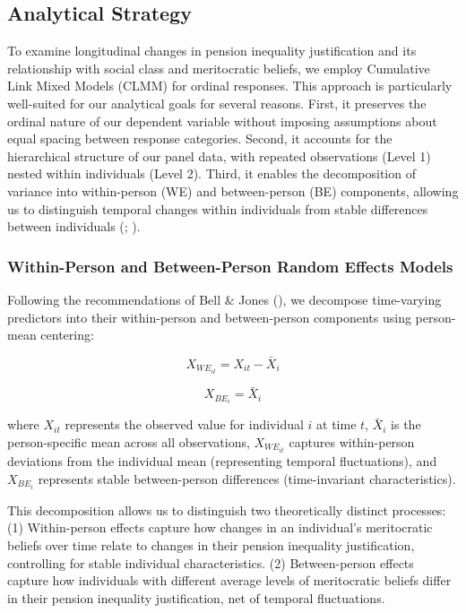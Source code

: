 \documentclass[
  12pt,
]{article}
\begin{document}
\subsection{Analytical Strategy}\label{analytical-strategy}

To examine longitudinal changes in pension inequality justification and
its relationship with social class and meritocratic beliefs, we employ
Cumulative Link Mixed Models (CLMM) for ordinal responses. This approach
is particularly well-suited for our analytical goals for several
reasons. First, it preserves the ordinal nature of our dependent
variable without imposing assumptions about equal spacing between
response categories. Second, it accounts for the hierarchical structure
of our panel data, with repeated observations (Level 1) nested within
individuals (Level 2). Third, it enables the decomposition of variance
into within-person (WE) and between-person (BE) components, allowing us
to distinguish temporal changes within individuals from stable
differences between individuals (; ).

\subsubsection{Within-Person and Between-Person Random Effects
Models}\label{within-person-and-between-person-random-effects-models}

Following the recommendations of Bell \& Jones
(), we decompose time-varying
predictors into their within-person and between-person components using
person-mean centering:

\[
X_{WE_{it}} = X_{it} - \bar{X}_i
\]

\[
X_{BE_i} = \bar{X}_i
\]

where \(X_{it}\) represents the observed value for individual \(i\) at
time \(t\), \(\bar{X}_i\) is the person-specific mean across all
observations, \(X_{WE_{it}}\) captures within-person deviations from the
individual mean (representing temporal fluctuations), and \(X_{BE_i}\)
represents stable between-person differences (time-invariant
characteristics).

This decomposition allows us to distinguish two theoretically distinct
processes: (1) Within-person effects capture how changes in an
individual's meritocratic beliefs over time relate to changes in their
pension inequality justification, controlling for stable individual
characteristics. (2) Between-person effects capture how individuals with
different average levels of meritocratic beliefs differ in their pension
inequality justification, net of temporal fluctuations.
\end{document}
